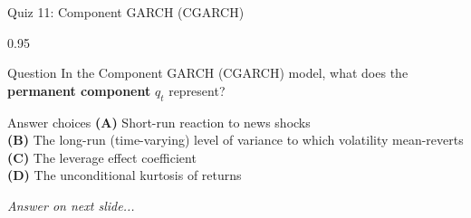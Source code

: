 \documentclass[9pt, aspectratio=169, t]{beamer}
\begin{document}
\begin{frame}{Quiz 11: Component GARCH (CGARCH)}
    \begin{cminipage}{0.95\textwidth}
    \begin{alertblock}{Question}
        In the Component GARCH (CGARCH) model, what does the \textbf{permanent component} $q_t$ represent?
    \end{alertblock}

    \vspace{0.4cm}

    \begin{block}{Answer choices}
        \textcolor{MainBlue}{\textbf{(A)}} Short-run reaction to news shocks\\[3pt]
        \textcolor{MainBlue}{\textbf{(B)}} The long-run (time-varying) level of variance to which volatility mean-reverts\\[3pt]
        \textcolor{MainBlue}{\textbf{(C)}} The leverage effect coefficient\\[3pt]
        \textcolor{MainBlue}{\textbf{(D)}} The unconditional kurtosis of returns
    \end{block}

    \vspace{0.5cm}

    \begin{center}
        \textit{Answer on next slide...}
    \end{center}
    \end{cminipage}
\end{frame}
\end{document}

